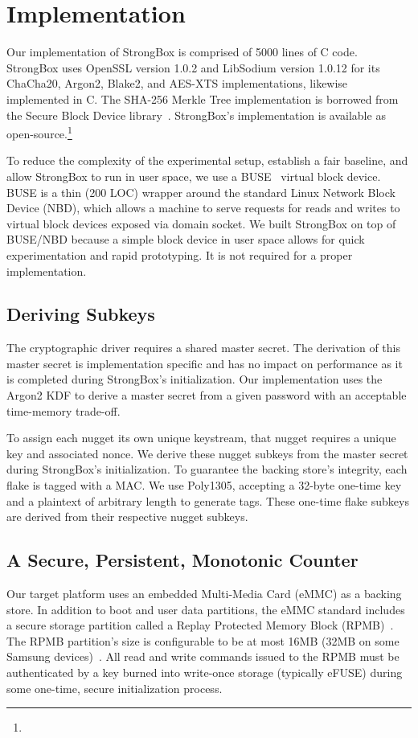 \section{Implementation} \label{sec:sb-implementation}

Our implementation of StrongBox is comprised of 5000 lines of C code. StrongBox
uses OpenSSL version 1.0.2 and LibSodium version 1.0.12 for its ChaCha20,
Argon2, Blake2, and AES-XTS implementations, likewise implemented in C. The
SHA-256 Merkle Tree implementation is borrowed from the Secure Block Device
library~\cite{SBD}. StrongBox's implementation is available as
open-source.\footnote{\StrongBoxURI}

To reduce the complexity of the experimental setup, establish a fair baseline,
and allow StrongBox to run in user space, we use a BUSE~\cite{BUSE} virtual
block device. BUSE is a thin (200 LOC) wrapper around the standard Linux Network
Block Device (NBD), which allows a machine to serve requests for reads and
writes to virtual block devices exposed via domain socket. We built StrongBox on
top of BUSE/NBD because a simple block device in user space allows for quick
experimentation and rapid prototyping. It is not required for a proper
implementation.

\subsection{Deriving Subkeys}
The cryptographic driver requires a shared master secret. The
derivation of this master secret is implementation specific and has no
impact on performance as it is completed during StrongBox's
initialization. Our implementation uses the Argon2 KDF to derive a
master secret from a given password with an acceptable time-memory
trade-off.

To assign each nugget its own unique keystream, that nugget requires a
unique key and associated nonce. We derive these nugget subkeys from
the master secret during StrongBox's initialization. To guarantee the
backing store's integrity, each flake is tagged with a MAC. We use
Poly1305, accepting a 32-byte one-time key and a plaintext of
arbitrary length to generate tags. These one-time flake subkeys are
derived from their respective nugget subkeys.

\subsection{A Secure, Persistent, Monotonic Counter} 
Our target platform uses an embedded Multi-Media Card (eMMC) as a
backing store. In addition to boot and user data partitions, the eMMC
standard includes a secure storage partition called a Replay Protected
Memory Block (RPMB)~\cite{eMMC-standard}. The RPMB partition's size
is configurable to be at most 16MB (32MB on some Samsung
devices)~\cite{RPMB}. All read and write commands issued to the RPMB
must be authenticated by a key burned into write-once storage
(typically eFUSE) during some one-time, secure initialization process.


